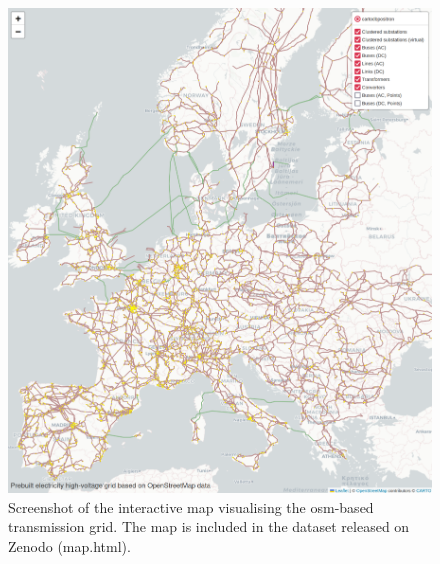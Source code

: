 \documentclass[fleqn,10pt]{wlscirep}
\let\autocite\cite
\begin{document}
\newpage
\begin{figure}[!htbp]
    \centering
    \includegraphics[width=\textwidth]{figures/fig_interactive_map_screenshot.png}
    \caption{Screenshot of the interactive map visualising the \acrshort{osm}-based transmission grid. The map is included in the dataset released on Zenodo (map.html).\autocite{xiongPrebuiltElectricityNetwork2024}}
    \label{fig:interactive_map_screenshot}
\end{figure}
\end{document}
